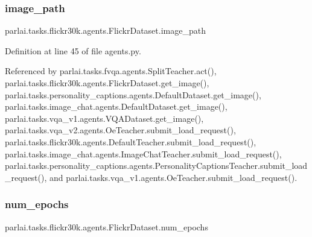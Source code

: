 \mbox{\label{classparlai_1_1tasks_1_1flickr30k_1_1agents_1_1FlickrDataset_aae4aad11c9ddb1cfd7ff524fabc221ee}} 
\subsubsection{\texorpdfstring{image\+\_\+path}{image\_path}}
{\footnotesize\ttfamily parlai.\+tasks.\+flickr30k.\+agents.\+Flickr\+Dataset.\+image\+\_\+path}



Definition at line 45 of file agents.\+py.



Referenced by parlai.\+tasks.\+fvqa.\+agents.\+Split\+Teacher.\+act(), parlai.\+tasks.\+flickr30k.\+agents.\+Flickr\+Dataset.\+get\+\_\+image(), parlai.\+tasks.\+personality\+\_\+captions.\+agents.\+Default\+Dataset.\+get\+\_\+image(), parlai.\+tasks.\+image\+\_\+chat.\+agents.\+Default\+Dataset.\+get\+\_\+image(), parlai.\+tasks.\+vqa\+\_\+v1.\+agents.\+V\+Q\+A\+Dataset.\+get\+\_\+image(), parlai.\+tasks.\+vqa\+\_\+v2.\+agents.\+Oe\+Teacher.\+submit\+\_\+load\+\_\+request(), parlai.\+tasks.\+flickr30k.\+agents.\+Default\+Teacher.\+submit\+\_\+load\+\_\+request(), parlai.\+tasks.\+image\+\_\+chat.\+agents.\+Image\+Chat\+Teacher.\+submit\+\_\+load\+\_\+request(), parlai.\+tasks.\+personality\+\_\+captions.\+agents.\+Personality\+Captions\+Teacher.\+submit\+\_\+load\+\_\+request(), and parlai.\+tasks.\+vqa\+\_\+v1.\+agents.\+Oe\+Teacher.\+submit\+\_\+load\+\_\+request().

\mbox{\label{classparlai_1_1tasks_1_1flickr30k_1_1agents_1_1FlickrDataset_a2768ac48773169dee24f6b52ec36dd42}} 
\subsubsection{\texorpdfstring{num\+\_\+epochs}{num\_epochs}}
{\footnotesize\ttfamily parlai.\+tasks.\+flickr30k.\+agents.\+Flickr\+Dataset.\+num\+\_\+epochs}



